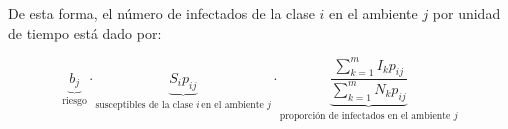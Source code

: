 De esta forma, el número de infectados de la clase \(i\) en el ambiente \(j\) por unidad de tiempo está dado por:

\[
\underbrace{b_j}_{\text{riesgo}} \cdot \underbrace{S_i p_{ij}}_{\text{susceptibles de la clase } i \, \text{en el ambiente } j} \cdot \underbrace{\frac{\sum_{k = 1}^m I_k p_{ij}}{\sum_{k = 1}^m N_k p_{ij}}}_{\text{proporción de infectados en el ambiente }j}
\]




